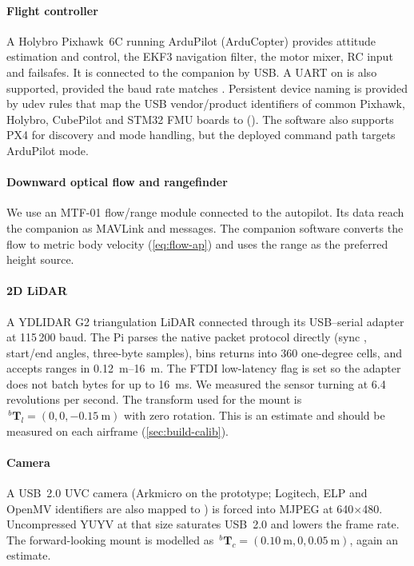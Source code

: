 \paragraph{Flight controller} A Holybro Pixhawk~6C running ArduPilot (ArduCopter)
provides attitude estimation and control, the EKF3 navigation
filter, the motor mixer, RC input and failsafes. It is connected to the companion by
USB. A UART on  is also supported, provided the baud rate matches
. Persistent device naming is provided by udev rules that map the
USB vendor/product identifiers of common Pixhawk, Holybro, CubePilot and STM32 FMU
boards to  (). The software also
supports PX4 for discovery and mode handling, but the deployed command path targets
ArduPilot  mode.

\paragraph{Downward optical flow and rangefinder} We use an MTF-01 flow/range
module connected to the autopilot.
Its data reach the companion as MAVLink  and 
messages. The companion software converts the flow to metric body velocity
(\cref{eq:flow-ap}) and uses the range as the preferred height source.

\paragraph{2D LiDAR} A YDLIDAR G2 triangulation LiDAR connected through its USB--serial
adapter at 115\,200 baud. The Pi parses the native packet protocol directly (sync
, start/end angles, three-byte samples), bins returns into 360 one-degree
cells, and accepts ranges in \SIrange{0.12}{16}{\metre}. The FTDI low-latency flag is
set so the adapter does not batch bytes for up to \SI{16}{\milli\second}. We measured the sensor
turning at 6.4 revolutions per second. The transform used for the
mount is $\,^{b}\mathbf{T}_{l}=(0,0,\SI{-0.15}{\metre})$ with zero rotation. This is an estimate and should
be measured on each airframe (\cref{sec:build-calib}).

\paragraph{Camera} A USB~2.0 UVC camera (Arkmicro  on the prototype;
Logitech, ELP and OpenMV identifiers are also mapped to ) is forced
into MJPEG at 640$\times$480. Uncompressed YUYV at that size saturates USB~2.0 and
lowers the frame rate. The forward-looking mount is modelled as
$\,^{b}\mathbf{T}_{c}=(\SI{0.10}{\metre},0,\SI{0.05}{\metre})$, again an estimate.

